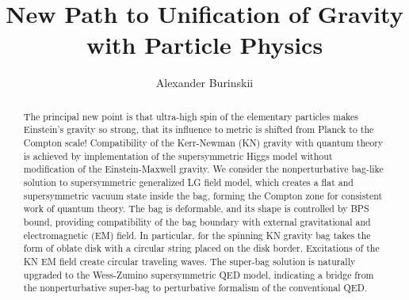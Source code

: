 \documentclass[aps,prd,twocolumn,showpacs]{revtex4}
\begin{document}
\def\b{\bar}
\def\d{\partial}
\def\D{\Delta}
\def\cD{{\cal D}}
\def\cK{{\cal K}}
\def\f{\varphi}
\def\g{\gamma}
\def\G{\Gamma}
\def\l{\lambda}
\def\L{\Lambda}
\def\M{{\Cal M}}
\def\m{\mu}
\def\n{\nu}
\def\p{\psi}
\def\q{\b q}
\def\r{\rho}
\def\t{\tau}
\def\x{\phi}
\def\X{\~\xi}
\def\~{\widetilde}
\def\h{\eta}
\def\bZ{\bar Z}
\def\cY{\bar Y}
\def\bY3{\bar Y_{,3}}
\def\Y3{Y_{,3}}
\def\z{\zeta}
\def\Z{{\b\zeta}}
\def\Y{{\bar Y}}
\def\cZ{{\bar Z}}
\def\`{\dot}
\def\be{\begin{equation}}
\def\ee{\end{equation}}
\def\bea{\begin{eqnarray}}
\def\eea{\end{eqnarray}}
\def\half{\frac{1}{2}}
\def\fn{\footnote}
\def\bh{black hole \ }
\def\cL{{\cal L}}
\def\cH{{\cal H}}
\def\cF{{\cal F}}
\def\cP{{\cal P}}
\def\cM{{\cal M}}
\def\ik{ik}
\def\mn{{\mu\nu}}
\def\a{\alpha}

\title{New Path to Unification of Gravity with Particle Physics}
\author{Alexander Burinskii}








\begin{abstract}
    The principal new point is that ultra-high spin of the elementary particles makes Einstein's gravity so strong, that its influence to metric is shifted from Planck to the Compton scale! Compatibility of the Kerr-Newman (KN) gravity with quantum theory is achieved by  implementation of the supersymmetric Higgs model without modification of the Einstein-Maxwell gravity. We consider the nonperturbative bag-like solution to supersymmetric generalized LG field model, which creates a flat and supersymmetric vacuum state inside the bag, forming the  Compton zone for consistent work of quantum theory.  The bag is deformable, and its shape is controlled by BPS bound, providing compatibility of the bag boundary with external gravitational and electromagnetic (EM) field. In particular, for the spinning KN gravity bag
   takes the form of oblate disk with a circular string placed on the disk border. Excitations of the KN EM field create circular traveling waves. The super-bag solution is naturally upgraded to the Wess-Zumino supersymmetric QED model, indicating a bridge from the nonperturbative super-bag  to perturbative formalism of the conventional QED.
\end{abstract}
\end{document}
